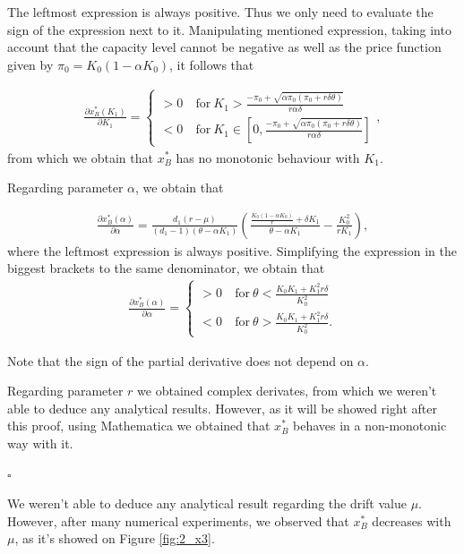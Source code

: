 The leftmost expression is always positive. Thus we only need to evaluate the sign of the expression next to it. Manipulating mentioned expression, taking into account that the capacity level cannot be negative as well as the price function given by $\pi_0=K_0(1-\alpha K_0)$, it follows that

\begin{align*}
\frac{\partial x^*_B ( K_1 ) }{\partial K_1}= 
\begin{cases}
>0 &\ \text{for} \ K_1>\frac{-\pi_0+\sqrt{\alpha \pi_0 (\pi_0 + r \delta \theta)}}{ r\alpha \delta}\\
<0 &\ \text{for} \ K_1 \in \left[ 0, \frac{-\pi_0+\sqrt{\alpha \pi_0(\pi_0 + r \delta \theta)}}{ r\alpha \delta} \right]
\end{cases},
\end{align*}
from which we obtain that $x^*_B$ has no monotonic behaviour with $K_1$.


Regarding parameter $\alpha$, we obtain that

\begin{align*}
\frac{\partial x^*_B ( \alpha ) }{\partial \alpha}= 
\frac{d_1 (r-\mu )}{ (d_1-1)(\theta-\alpha K_1)}  \left( \frac{\frac{K_0(1-\alpha K_0)}{r}+ \delta K_1  }{\theta-\alpha K_1} -\frac{ K_0^2}{r K_1} \right),
\end{align*}
where the leftmost expression is always positive. Simplifying the expression in the biggest brackets to the same denominator, we obtain that
\begin{align*}
\frac{\partial x^*_B ( \alpha ) }{\partial \alpha}= 
\begin{cases}
>0 &\ \text{for} \ \theta < \frac{K_0 K_1 +K_1^2 r\delta}{K_0^2}\\
<0 &\ \text{for} \ \theta > \frac{K_0 K_1 +K_1^2 r\delta}{K_0^2}.
\end{cases}
\end{align*}

Note that the sign of the partial derivative does not depend on $\alpha$.

Regarding parameter $r$ we obtained complex derivates, from which we weren't able to deduce any analytical results. However, as it will be showed right after this proof, using Mathematica we obtained that $x^*_B$ behaves in a non-monotonic way with it.

\begin{flushright}
	$\square$
\end{flushright}

We weren't able to deduce any analytical result regarding the drift value $\mu$. However, after many numerical experiments, we observed that $x_B^*$ decreases with $\mu$, as it's showed on Figure \ref{fig:2_x3}.


